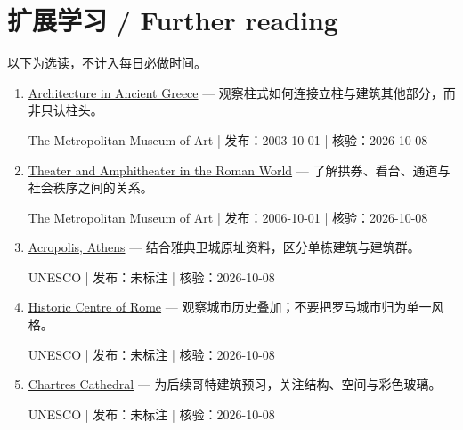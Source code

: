 \documentclass[11pt]{article}
\newcommand{\Needspace}[1]{\par\ifdim\dimexpr\pagegoal-\pagetotal\relax<#1\relax\newpage\fi}
\begin{document}
\Needspace{6\baselineskip}\section*{扩展学习 / Further reading}\small 以下为选读，不计入每日必做时间。\begin{enumerate}[leftmargin=1.6em]

\item [S1] \href{https://www.metmuseum.org/essays/architecture-in-ancient-greece}{Architecture in Ancient Greece} — 观察柱式如何连接立柱与建筑其他部分，而非只认柱头。\par The Metropolitan Museum of Art | 发布：2003-10-01 | 核验：2026-10-08

\item [S2] \href{https://www.metmuseum.org/essays/theater-and-amphitheater-in-the-roman-world}{Theater and Amphitheater in the Roman World} — 了解拱券、看台、通道与社会秩序之间的关系。\par The Metropolitan Museum of Art | 发布：2006-10-01 | 核验：2026-10-08

\item [S3] \href{https://whc.unesco.org/en/list/404/}{Acropolis, Athens} — 结合雅典卫城原址资料，区分单栋建筑与建筑群。\par UNESCO | 发布：未标注 | 核验：2026-10-08

\item [S4] \href{https://whc.unesco.org/en/list/91/}{Historic Centre of Rome} — 观察城市历史叠加；不要把罗马城市归为单一风格。\par UNESCO | 发布：未标注 | 核验：2026-10-08

\item [S5] \href{https://whc.unesco.org/en/list/81/}{Chartres Cathedral} — 为后续哥特建筑预习，关注结构、空间与彩色玻璃。\par UNESCO | 发布：未标注 | 核验：2026-10-08

\end{enumerate}
\end{document}
